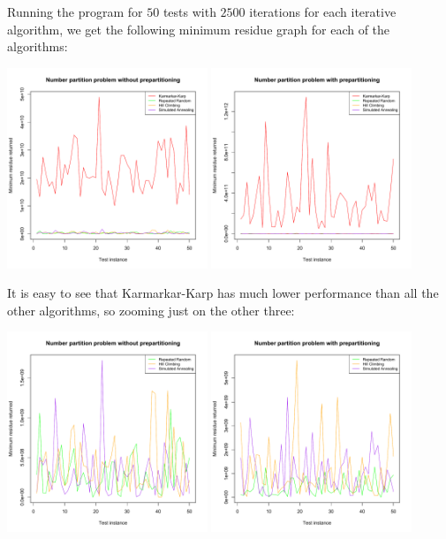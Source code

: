 \documentclass{article}
\begin{document}
Running the program for $50$ tests with $2500$ iterations for each iterative algorithm, we get the following minimum residue graph for each of the algorithms:
\begin{center}
    \includegraphics[width=0.45\textwidth]{graph1} \includegraphics[width=0.45\textwidth]{graph1_pre}\\
\end{center}
It is easy to see that Karmarkar-Karp has much lower performance than all the other algorithms, so zooming just on the other three:
\begin{center}
    \includegraphics[width=0.45\textwidth]{graph2} \includegraphics[width=0.45\textwidth]{graph2_pre}
\end{center}
\end{document}

